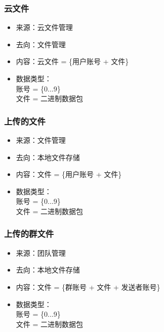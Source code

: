             \subsubsection{云文件}
            \begin{itemize}
            \item 来源：云文件管理
            \item 去向：文件管理
            \item 内容：云文件 = \{用户账号 + 文件\}
            \item 数据类型：\\
            账号 = \{0...9\}\\
            文件 = 二进制数据包\\
            \end{itemize}
            \subsubsection{上传的文件}
            \begin{itemize}
            \item 来源：文件管理
            \item 去向：本地文件存储
            \item 内容：文件 = \{用户账号 + 文件\}
            \item 数据类型：\\
            账号 = \{0...9\}\\
            文件 = 二进制数据包\\
            \end{itemize}

            \subsubsection{上传的群文件}
            \begin{itemize}
            \item 来源：团队管理
            \item 去向：本地文件存储
            \item 内容：文件 = \{群账号 + 文件 + 发送者账号\}
            \item 数据类型：\\
            账号 = \{0...9\}\\
            文件 = 二进制数据包\\
            \end{itemize}

